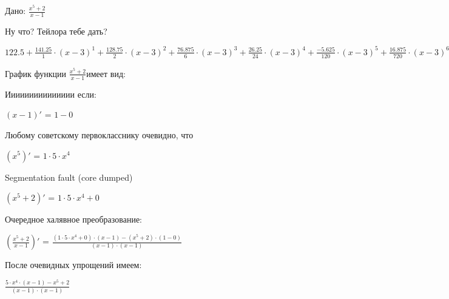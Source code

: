\documentclass{article}
\begin{document}
Дано: $\frac{{x}^{5} + 2}{x - 1}$

\bigskip Ну что? Тейлора тебе дать?

$122.5 + \frac{141.25}{1} \cdot {(x-3)}^{1} + \frac{128.75}{2} \cdot {(x-3)}^{2} + \frac{76.875}{6} \cdot {(x-3)}^{3} + \frac{26.25}{24} \cdot {(x-3)}^{4} + \frac{-5.625}{120} \cdot {(x-3)}^{5} + \frac{16.875}{720} \cdot {(x-3)}^{6} + \frac{-59.0625}{5040} \cdot {(x-3)}^{7} + \overline{\overline{o}}({x}^{7}) $

\bigskip График функции $\frac{{x}^{5} + 2}{x - 1}$имеет вид:

\begin{figure}[h]\label{fig:t}\end{figure}\bigskip Иииииииииииииии если:

$(x - 1)'$ = $1 - 0$

\bigskip Любому советскому первокласснику очевидно, что

$({x}^{5})'$ = $1 \cdot 5 \cdot {x}^{4}$

\bigskip Segmentation fault (core dumped)

$({x}^{5} + 2)'$ = $1 \cdot 5 \cdot {x}^{4} + 0$

\bigskip Очередное халявное преобразование:

$(\frac{{x}^{5} + 2}{x - 1})'$ = $\frac{(1 \cdot 5 \cdot {x}^{4} + 0) \cdot (x - 1) - ({x}^{5} + 2) \cdot (1 - 0)}{(x - 1) \cdot (x - 1)}$

\bigskip После очевидных упрощений имеем:

$\frac{5 \cdot {x}^{4} \cdot (x - 1) - {x}^{5} + 2}{(x - 1) \cdot (x - 1)}$
\end{document}
